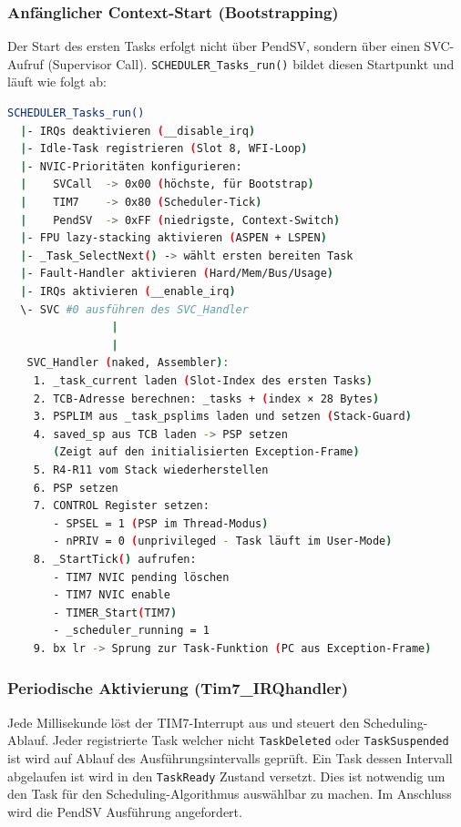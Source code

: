 \newpage

\subsubsection{Anfänglicher Context-Start (Bootstrapping)}\label{ssub:bootstrap}
Der Start des ersten Tasks erfolgt nicht über PendSV, sondern über einen SVC-Aufruf (Supervisor Call). \texttt{SCHEDULER\_Tasks\_run()}  bildet diesen Startpunkt und läuft wie folgt ab:

\begin{lstlisting}[language=bash, numbers=none, caption={Bootstrap Prozess}, label={lst:bootstrap}]
SCHEDULER_Tasks_run()
  |- IRQs deaktivieren (__disable_irq)
  |- Idle-Task registrieren (Slot 8, WFI-Loop)
  |- NVIC-Prioritäten konfigurieren:
  |    SVCall  -> 0x00 (höchste, für Bootstrap)
  |    TIM7    -> 0x80 (Scheduler-Tick)
  |    PendSV  -> 0xFF (niedrigste, Context-Switch)
  |- FPU lazy-stacking aktivieren (ASPEN + LSPEN)
  |- _Task_SelectNext() -> wählt ersten bereiten Task
  |- Fault-Handler aktivieren (Hard/Mem/Bus/Usage)
  |- IRQs aktivieren (__enable_irq)
  \- SVC #0 ausführen des SVC_Handler
                |
                |
   SVC_Handler (naked, Assembler):
    1. _task_current laden (Slot-Index des ersten Tasks)
    2. TCB-Adresse berechnen: _tasks + (index × 28 Bytes)
    3. PSPLIM aus _task_psplims laden und setzen (Stack-Guard)
    4. saved_sp aus TCB laden -> PSP setzen
       (Zeigt auf den initialisierten Exception-Frame)
    5. R4-R11 vom Stack wiederherstellen
    6. PSP setzen
    7. CONTROL Register setzen:
       - SPSEL = 1 (PSP im Thread-Modus)
       - nPRIV = 0 (unprivileged - Task läuft im User-Mode)
    8. _StartTick() aufrufen:
       - TIM7 NVIC pending löschen
       - TIM7 NVIC enable
       - TIMER_Start(TIM7)
       - _scheduler_running = 1
    9. bx lr -> Sprung zur Task-Funktion (PC aus Exception-Frame)
\end{lstlisting}

\subsubsection{Periodische Aktivierung (Tim7\_IRQhandler)}\label{ssub:tim7-irq}
Jede Millisekunde löst der TIM7-Interrupt aus und steuert den Scheduling-Ablauf. Jeder registrierte Task welcher nicht \texttt{TaskDeleted} oder \texttt{TaskSuspended} ist wird auf Ablauf des Ausführungsintervalls geprüft. Ein Task dessen Intervall abgelaufen ist wird in den \texttt{TaskReady} Zustand versetzt. Dies ist notwendig um den Task für den Scheduling-Algorithmus auswählbar zu machen. Im Anschluss wird die PendSV Ausführung angefordert.

